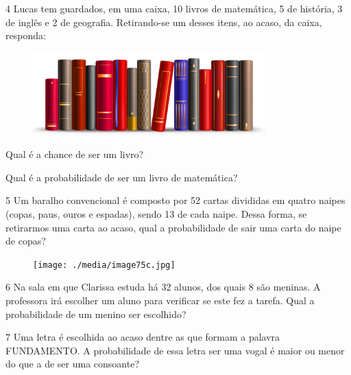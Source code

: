 \num{4} Lucas tem guardados, em uma caixa, 10 livros de matemática, 5 de história, 3 de inglês e
2 de geografia. Retirando-se um desses itens, ao acaso, da caixa,
responda:

\begin{figure}[htpb!]
\centering
\includegraphics[width=0.8\textwidth]{./media/image75b.jpg}
\end{figure}

\begin{escolha}
\item Qual é a chance de ser um livro?

\item  Qual é a probabilidade de ser um livro de matemática?
\end{escolha}

\num{5} Um baralho convencional é composto por 52 cartas divididas em quatro
naipes (copas, paus, ouros e espadas), sendo 13 de cada naipe. Dessa
forma, se retirarmos uma carta ao acaso, qual a probabilidade de sair
uma carta do naipe de copas?

\begin{figure}[htpb!]
\centering
\texttt{[image: ./media/image75c.jpg]}
\end{figure}


\num{6} Na sala em que Clarissa estuda há 32 alunos, dos quais 8 são meninas. A
professora irá escolher um aluno para verificar se este fez a tarefa.
Qual a probabilidade de um menino ser escolhido?

\num{7} Uma letra é escolhida ao acaso dentre as que formam a palavra
FUNDAMENTO. A probabilidade de essa letra ser uma vogal é maior ou menor do que a de ser uma consoante?

